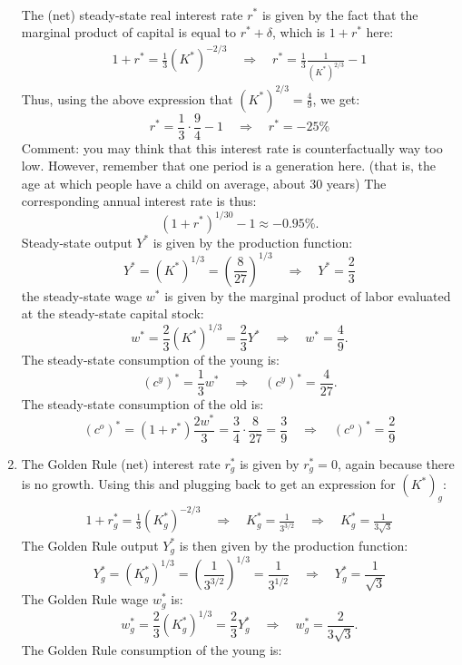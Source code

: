 \documentclass[]{book}
\begin{document}
\begin{enumerate}
\[\begin{aligned}
  \end{aligned}
  \] The (net) steady-state real interest rate \(r^{*}\) is given by the
  fact that the marginal product of capital is equal to
  \(r^{*} + \delta\), which is \(1+r^{*}\) here: \[
  \begin{aligned}
  1+r^{*} = \frac{1}{3}(K^{*})^{-2/3} \quad \Rightarrow \quad r^{*}=\frac{1}{3}\frac{1}{(K^{*})^{2/3}}-1
  \end{aligned}
  \] Thus, using the above expression that
  \((K^{*})^{2/3} = \frac{4}{9}\), we get:
  \[r^{*}=\frac{1}{3} \cdot \frac{9}{4}-1 \quad \Rightarrow \quad  \boxed{r^{*}= -25\%}\]
  Comment: you may think that this interest rate is counterfactually way
  too low. However, remember that one period is a generation here. (that
  is, the age at which people have a child on average, about 30 years)
  The corresponding annual interest rate is thus:
  \[(1+r^{*})^{1/30}-1 \approx -0.95\%.\] Steady-state output \(Y^{*}\)
  is given by the production function:
  \[Y^{*} = (K^{*})^{1/3} = \left(\frac{8}{27}\right)^{1/3} \quad \Rightarrow \quad \boxed{Y^{*} =\frac{2}{3}}\]
  the steady-state wage \(w^{*}\) is given by the marginal product of
  labor evaluated at the steady-state capital stock:
  \[w^{*}=\frac{2}{3}(K^{*})^{1/3}=\frac{2}{3}Y^{*} \quad \Rightarrow \quad \boxed{w^{*} = \frac{4}{9}}.\]
  The steady-state consumption of the young is:
  \[(c^y)^{*} = \frac{1}{3}w^{*} \quad \Rightarrow \quad \boxed{(c^y)^{*} = \frac{4}{27}}.\]
  The steady-state consumption of the old is:
  \[(c^o)^{*} = (1+r^{*})\frac{2w^{*}}{3} = \frac{3}{4} \cdot \frac{8}{27} = \frac{3}{9} \quad \Rightarrow \quad \boxed{(c^o)^{*} = \frac{2}{9}}\]
\item
  The Golden Rule (net) interest rate \(r^{*}_g\) is given by
  \(r^{*}_g=0\), again because there is no growth. Using this and
  plugging back to get an expression for \((K^{*})_g\): \[
  \begin{aligned}
  1+r^{*}_g = \frac{1}{3}(K^{*}_g)^{-2/3} \quad \Rightarrow \quad K_g^{*}=\frac{1}{3^{3/2}} \quad \Rightarrow \quad \boxed{K_g^{*}=\frac{1}{3\sqrt{3}}}
  \end{aligned}
  \] The Golden Rule output \(Y^{*}_g\) is then given by the production
  function:
  \[Y^{*}_g=(K^{*}_g)^{1/3} = \left(\frac{1}{3^{3/2}}\right)^{1/3} = \frac{1}{3^{1/2}} \quad \Rightarrow \quad \boxed{Y^{*}_g = \frac{1}{\sqrt{3}}}\]
  The Golden Rule wage \(w^{*}_g\) is:
  \[w^{*}_g=\frac{2}{3}(K^{*}_g)^{1/3}=\frac{2}{3}Y^{*}_g \quad \Rightarrow \quad \boxed{w^{*}_g = \frac{2}{3\sqrt{3}}}.\]
  The Golden Rule consumption of the young is:

\end{enumerate}
\end{document}
